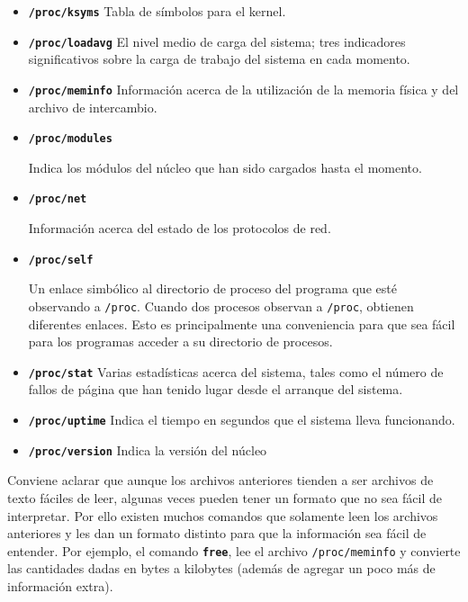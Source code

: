 \documentclass[12pt]{article}
\begin{document}
\begin{itemize}
	

	\item 

	\textbf{\texttt{/proc/ksyms}}
	 Tabla de símbolos para el
	kernel.
	
	\item \textbf{\texttt{/proc/loadavg}}
	 El nivel medio de carga del sistema; tres indicadores
	significativos sobre la carga de trabajo del sistema en cada
	momento.
	
	\item \textbf{\texttt{/proc/meminfo}}
	 Información acerca de la utilización de la memoria
	física y 	del archivo de
	intercambio.
	
	\item
	
	\textbf{\texttt{/proc/modules}}
	
	 Indica los módulos del núcleo que han sido cargados
	hasta el 	momento.
	

	\item \textbf{\texttt{/proc/net}}         
    
	 Información acerca del estado de los protocolos de
	red.
	
	\item
	
	\textbf{\texttt{/proc/self}}
	
	 Un enlace simbólico al directorio de proceso del
	programa que esté observando a \texttt{/proc}. Cuando dos
	procesos observan a \texttt{/proc}, obtienen diferentes
	enlaces. Esto es principalmente una conveniencia para que sea fácil para
	los programas acceder a su directorio de
	procesos.
	
	\item \textbf{\texttt{/proc/stat}}
	 Varias estadísticas acerca del sistema, tales como el
	número de fallos de página que han tenido lugar desde el arranque del
	sistema.
	
	\item \textbf{\texttt{/proc/uptime}}
	 Indica el tiempo en segundos que el sistema lleva
	funcionando.
	
	\item \textbf{\texttt{/proc/version}}
	 Indica la versión del núcleo
	
	
	 \end{itemize} 

    Conviene aclarar que aunque los archivos anteriores tienden a ser
    archivos de texto fáciles de leer, algunas veces pueden tener un formato
    que no sea fácil de interpretar. Por ello existen muchos comandos que
    solamente leen los archivos anteriores y les dan un formato distinto para
    que la información sea fácil de entender. Por ejemplo, el comando
    \texttt{\textbf{free}}, lee el archivo \texttt{/proc/meminfo}
    y convierte las cantidades dadas en bytes a kilobytes (además de agregar un
    poco más de información extra). 
\end{document}
